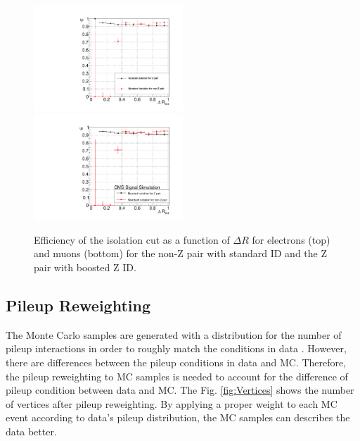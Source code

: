 \begin{figure}[hp]
\begin{center}
\includegraphics[width=0.5\textwidth]{plot/Isolation_electrons.pdf}\\
\includegraphics[width=0.5\textwidth]{plot/Isolation_muons.pdf}
\end{center} 
\caption{\label{fig:Iso_Eff}Efficiency of the isolation cut as a function of $\Delta R$ for electrons (top) and muons (bottom) for the non-Z pair with standard ID and the Z pair with boosted Z ID.}
\end{figure} 


\clearpage

\subsection{Pileup Reweighting}

The Monte Carlo samples are generated with a distribution for the number of pileup interactions in order to roughly match the conditions in data \cite{pileup}. However, there are differences between the pileup conditions in data and MC. Therefore, the pileup reweighting to MC samples is needed to account for the difference of pileup condition between data and MC. The Fig. \ref{fig:Vertices} shows the number of vertices after pileup reweighting. By applying a proper weight to each MC event according to data's pileup distribution, the MC samples can describes the data better.  

